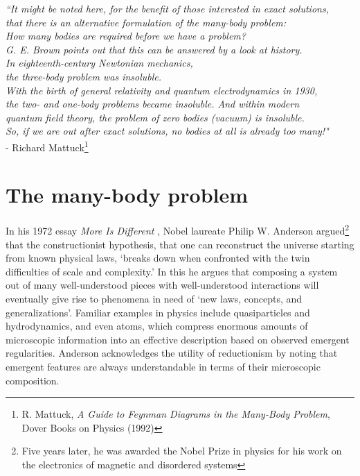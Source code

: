 	\begin{adjustwidth}{1.5cm}{0cm}
	\begin{flushright}
	{\fontsize{11}{13}\emph{
	``It might be noted here, for the benefit of those interested in exact solutions, \\
	that there is an alternative formulation of the many-body problem:\\
	How many bodies are required before we have a problem? \\
	G.	E.	Brown points out that this can be answered by a look at history.	\\
	In eighteenth-century Newtonian mechanics, \\
	the three-body problem was insoluble.\\
	With the birth of general relativity and quantum electrodynamics in 1930,\\ 
	the two- and one-body problems became insoluble.
	And within modern\\
	quantum field theory, the problem of zero bodies (vacuum) is insoluble.\\
	So, if we are out after exact solutions, no bodies at all is already too many!"}\\
	- Richard Mattuck\footnote{R.
	Mattuck, \emph{A Guide to Feynman Diagrams in the Many-Body Problem}, Dover Books on Physics (1992)}}
	\end{flushright}

	\end{adjustwidth}

\section{The many-body problem}


	In his 1972 essay \emph{More Is Different} \cite{Anderson72}, Nobel laureate Philip W.
	Anderson argued\footnote{Five years later, he was awarded the Nobel Prize in physics for his work on the electronics of magnetic and disordered systems} that the constructionist hypothesis, that one can reconstruct the universe starting from known physical laws,  `breaks down when confronted with the twin difficulties of scale and complexity.' 
	In this he argues that composing a system out of many well-understood pieces with well-understood interactions will eventually give rise to  phenomena in need of `new laws, concepts, and generalizations'.
	Familiar examples in physics include quasiparticles and hydrodynamics, and even atoms, which compress enormous amounts of microscopic information into an effective description based on observed emergent regularities.
	Anderson acknowledges the utility of reductionism by noting that emergent features are always understandable in terms of their microscopic composition.


